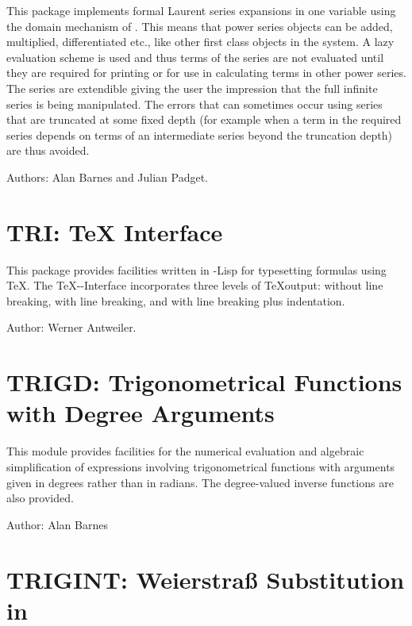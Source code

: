 This package implements formal Laurent series expansions in one variable
using the domain mechanism of \REDUCE.  This means that power series
objects can be added, multiplied, differentiated etc.,  like other first
class objects in the system.  A lazy evaluation scheme is used and thus
terms of the series are not evaluated until they are required for printing
or for use in calculating terms in other power series.  The series are
extendible giving the user the impression that the full infinite series is
being manipulated.  The errors that can sometimes occur using series that
are truncated at some fixed depth (for example when a term in the required
series depends on terms of an intermediate series beyond the truncation
depth) are thus avoided.

Authors:  Alan Barnes and Julian Padget.



\newpage
\fi

\section{TRI: TeX \REDUCE Interface}

This package provides facilities written in \REDUCE-Lisp for typesetting
\REDUCE formulas using \TeX.  The \TeX-\REDUCE-Interface incorporates three
levels of \TeX output: without line breaking, with line breaking, and
with line breaking plus indentation.

Author: Werner Antweiler.

\newpage

\section{TRIGD: Trigonometrical Functions with Degree Arguments}

This module provides facilities for the numerical evaluation and
algebraic simplification of expressions involving trigonometrical
functions with arguments given in degrees rather than in radians. The
degree-valued inverse functions are also provided.

Author: Alan Barnes



\newpage

\section{TRIGINT: Weierstra\ss{} Substitution in \REDUCE}

